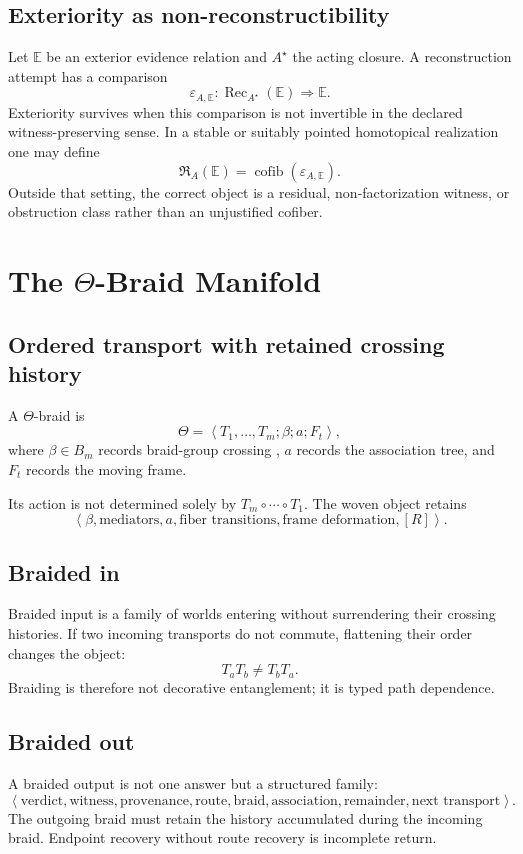 \documentclass[12pt,openany]{book}
\theoremstyle{remark}
\DeclareMathOperator{\Rec}{Rec}
\DeclareMathOperator{\cofib}{cofib}
\newcommand{\Remainder}{[R]}
\newcommand{\typedtuple}[1]{\left\langle #1 \right\rangle}
\begin{document}
\section{Exteriority as non-reconstructibility}
Let $\mathbb E$ be an exterior evidence relation and $A^\star$ the acting closure. A reconstruction attempt has a comparison
\[
\varepsilon_{A,\mathbb E}:
\Rec_{A^\star}(\mathbb E)\Longrightarrow\mathbb E.
\]
Exteriority survives when this comparison is not invertible in the declared witness-preserving sense. In a stable or suitably pointed homotopical realization one may define
\[
\mathfrak R_A(\mathbb E)=\cofib(\varepsilon_{A,\mathbb E}).
\]
Outside that setting, the correct object is a residual, non-factorization witness, or obstruction class rather than an unjustified cofiber.

\chapter{The \texorpdfstring{$\Theta$}{Theta}-Braid Manifold}
\label{ch:theta-braid}

\section{Ordered transport with retained crossing history}
A $\Theta$-braid is
\[
\Theta=\typedtuple{T_1,\ldots,T_m;\beta;a;F_t},
\]
where $\beta\in B_m$ records braid-group crossing \cite{Artin1925,KasselTuraev}, $a$ records the association tree, and $F_t$ records the moving frame.

Its action is not determined solely by $T_m\circ\cdots\circ T_1$. The woven object retains
\[
\typedtuple{\beta,\text{mediators},a,\text{fiber transitions},\text{frame deformation},\Remainder}.
\]

\section{Braided in}
Braided input is a family of worlds entering without surrendering their crossing histories. If two incoming transports do not commute, flattening their order changes the object:
\[
T_aT_b\neq T_bT_a.
\]
Braiding is therefore not decorative entanglement; it is typed path dependence.

\section{Braided out}
A braided output is not one answer but a structured family:
\[
\typedtuple{
\text{verdict},
\text{witness},
\text{provenance},
\text{route},
\text{braid},
\text{association},
\text{remainder},
\text{next transport}
}.
\]
The outgoing braid must retain the history accumulated during the incoming braid. Endpoint recovery without route recovery is incomplete return.
\end{document}
